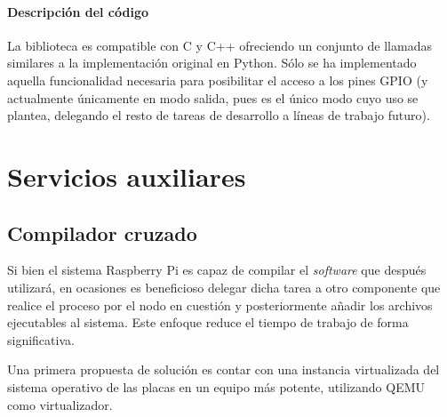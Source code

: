 \paragraph{Descripción del código\\}

La biblioteca es compatible con C y C++ ofreciendo un conjunto de llamadas similares a la implementación original en Python. Sólo se ha implementado aquella funcionalidad necesaria para posibilitar el acceso a los pines GPIO (y actualmente únicamente en modo salida, pues es el único modo cuyo uso se plantea, delegando el resto de tareas de desarrollo a líneas de trabajo futuro). %

\section{Servicios auxiliares}
\label{chapter:serviciosauxiliares}
\subsection{Compilador cruzado}

Si bien el sistema Raspberry Pi es capaz de compilar el \textit{software} que después utilizará, en ocasiones es beneficioso delegar dicha tarea a otro componente que realice el proceso por el nodo en cuestión y posteriormente añadir los archivos ejecutables al sistema. Este enfoque reduce el tiempo de trabajo de forma significativa.

Una primera propuesta de solución es contar con una instancia virtualizada del sistema operativo de las placas en un equipo más potente, utilizando QEMU como virtualizador.

